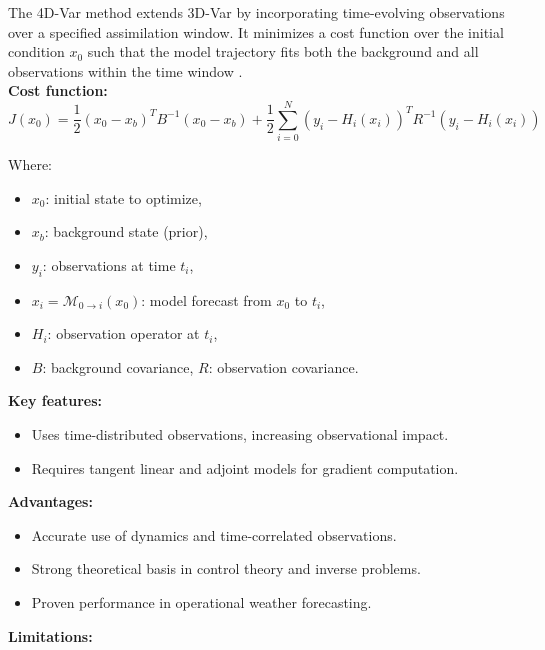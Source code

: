 \documentclass[a4paper]{article}
\begin{document}
The 4D-Var method extends 3D-Var by incorporating time-evolving observations over a specified assimilation window. 
It minimizes a cost function over the initial condition $x_0$ such that the model trajectory fits both the 
background and all observations within the time window \parencite{courtier1994strategy, rabier2000ecmwf}.\\

\textbf{Cost function:}\\

\[
J(x_0) = \frac{1}{2}(x_0 - x_b)^T B^{-1} (x_0 - x_b) + \frac{1}{2} \sum_{i=0}^{N} (y_i - H_i(x_i))^T R^{-1} (y_i - H_i(x_i))
\]

Where:\\

\begin{itemize}
  \item $x_0$: initial state to optimize,
  \item $x_b$: background state (prior),
  \item $y_i$: observations at time $t_i$,
  \item $x_i = \mathcal{M}_{0 \rightarrow i}(x_0)$: model forecast from $x_0$ to $t_i$,
  \item $H_i$: observation operator at $t_i$,
  \item $B$: background covariance, $R$: observation covariance.
\end{itemize}

\textbf{Key features:}\\

\begin{itemize}
  \item Uses time-distributed observations, increasing observational impact.
  \item Requires tangent linear and adjoint models for gradient computation.
\end{itemize}

\textbf{Advantages:}\\

\begin{itemize}
  \item Accurate use of dynamics and time-correlated observations.
  \item Strong theoretical basis in control theory and inverse problems.
  \item Proven performance in operational weather forecasting.
\end{itemize}

\textbf{Limitations:}\\
\end{document}
